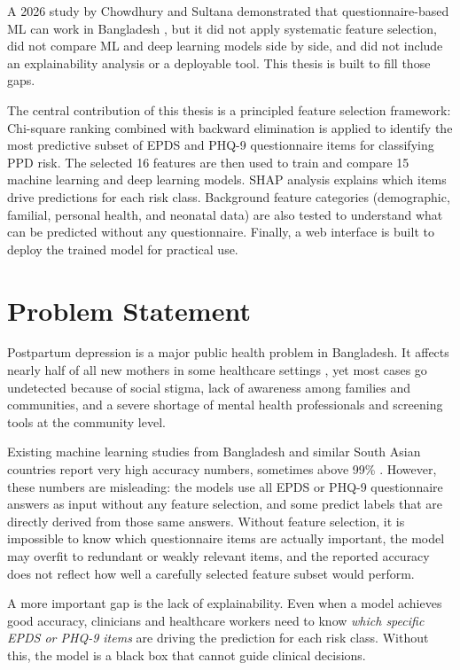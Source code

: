 A 2026 study by Chowdhury and Sultana demonstrated that questionnaire-based ML can work in Bangladesh \cite{chowdhury2026assessing}, but it did not apply systematic feature selection, did not compare ML and deep learning models side by side, and did not include an explainability analysis or a deployable tool. This thesis is built to fill those gaps.

The central contribution of this thesis is a principled feature selection framework: Chi-square ranking combined with backward elimination is applied to identify the most predictive subset of EPDS and PHQ-9 questionnaire items for classifying PPD risk. The selected 16 features are then used to train and compare 15 machine learning and deep learning models. SHAP analysis explains which items drive predictions for each risk class. Background feature categories (demographic, familial, personal health, and neonatal data) are also tested to understand what can be predicted without any questionnaire. Finally, a web interface is built to deploy the trained model for practical use.

\section{Problem Statement}

Postpartum depression is a major public health problem in Bangladesh. It affects nearly half of all new mothers in some healthcare settings \cite{shirin2024burden}, yet most cases go undetected because of social stigma, lack of awareness among families and communities, and a severe shortage of mental health professionals and screening tools at the community level.

Existing machine learning studies from Bangladesh and similar South Asian countries report very high accuracy numbers, sometimes above 99\% \cite{nasim2024novel, zohora2024machine}. However, these numbers are misleading: the models use all EPDS or PHQ-9 questionnaire answers as input without any feature selection, and some predict labels that are directly derived from those same answers. Without feature selection, it is impossible to know which questionnaire items are actually important, the model may overfit to redundant or weakly relevant items, and the reported accuracy does not reflect how well a carefully selected feature subset would perform.

A more important gap is the lack of explainability. Even when a model achieves good accuracy, clinicians and healthcare workers need to know \textit{which specific EPDS or PHQ-9 items} are driving the prediction for each risk class. Without this, the model is a black box that cannot guide clinical decisions.

